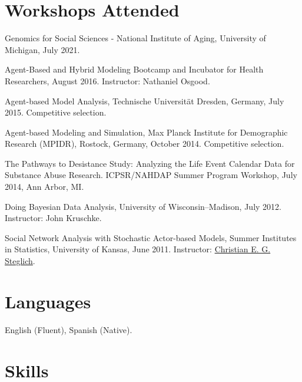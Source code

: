 \documentclass[10pt,letterpaper]{article}
\renewenvironment{itemize}{
  \begin{list}{}{
    \setlength{\leftmargin}{1.5em}
    \setlength{\itemsep}{0.25em}
    \setlength{\parskip}{0pt}
    \setlength{\parsep}{0.25em}
  }
}{
  \end{list}
}
\begin{document}
\section*{Workshops Attended}

\begin{itemize}

\item Genomics for Social Sciences - National Institute of Aging, University of Michigan, July 2021. 
\item Agent-Based and Hybrid Modeling Bootcamp and Incubator for Health Researchers, August 2016. Instructor: Nathaniel Osgood.
\item Agent-based Model Analysis, Technische Universität Dresden, Germany, July 2015. Competitive selection.
\item Agent-based Modeling and Simulation, Max Planck Institute for Demographic Research (MPIDR), Rostock, Germany, October 2014. Competitive selection.
\item The Pathways to Desistance Study: Analyzing the Life Event Calendar Data for Substance Abuse Research. ICPSR/NAHDAP Summer Program Workshop, July 2014, Ann Arbor, MI.
\item Doing Bayesian Data Analysis, University of Wisconsin--Madison, July 2012. Instructor: John Kruschke.
\item Social Network Analysis with Stochastic Actor-based Models, Summer Institutes in Statistics,  University of Kansas, June 2011. Instructor: \href{http://www.ppsw.rug.nl/~steglich/sites/index.htm}{Christian E. G. Steglich}.

 \end{itemize}

\section*{Languages}

\begin{itemize}
\item English (Fluent), Spanish (Native).
\end{itemize}

\section*{Skills}
\end{document}
